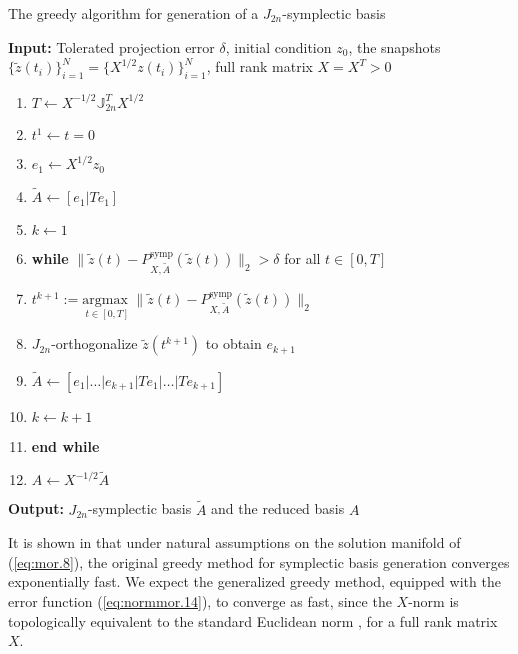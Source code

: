 \begin{algorithm} 
\caption{The greedy algorithm for generation of a $J_{2n}$-symplectic basis} \label{alg:2}
{\bf Input:} Tolerated projection error $\delta$, initial condition $ z_0$, the snapshots $\{\tilde z(t_i)\}_{i=1}^{N} = \{X^{1/2} z(t_i)\}_{i=1}^{N}$, full rank matrix $X=X^T>0$
\begin{enumerate}
\item $T \leftarrow X^{-1/2}\mathbb J_{2n}^T X^{1/2}$
\item $t^1 \leftarrow t=0$
\item $e_1 \leftarrow X^{1/2}z_0$
\item $\tilde A \leftarrow [e_1|Te_1]$
\item $k \leftarrow 1$
\item \textbf{while} $\| \tilde z(t) - P^\text{symp}_{X,\tilde A}( \tilde z(t) ) \|_2 > \delta$ for all $t \in [0,T]$
\item \hspace{0.5cm} $t^{k+1} := \underset{t\in [0,T]}{\text{argmax }} \| \tilde z(t) - P^\text{symp}_{X,\tilde A}( \tilde z(t) ) \|_2$
\item \hspace{0.5cm} $J_{2n}$-orthogonalize $ \tilde z(t^{k+1})$ to obtain $e_{k+1}$
\item \hspace{0.5cm} $\tilde A \leftarrow [e_1|\dots |e_{k+1} | Te_1|\dots| Te_{k+1}]$
\item \hspace{0.5cm} $k \leftarrow k+1$
\item \textbf{end while}
\item $A\leftarrow X^{-1/2} \tilde A$
\end{enumerate}
\vspace{0.5cm}
{\bf Output:} $J_{2n}$-symplectic basis $\tilde A$ and the reduced basis $A$
\end{algorithm}

It is shown in \cite{doi:10.1137/17M1111991} that under natural assumptions on the solution manifold of (\ref{eq:mor.8}), the original greedy method for symplectic basis generation converges exponentially fast. We expect the generalized greedy method, equipped with the error function (\ref{eq:normmor.14}), to converge as fast, since the $X$-norm is topologically equivalent to the standard Euclidean norm \cite{friedman1970foundations}, for a full rank matrix $X$.

